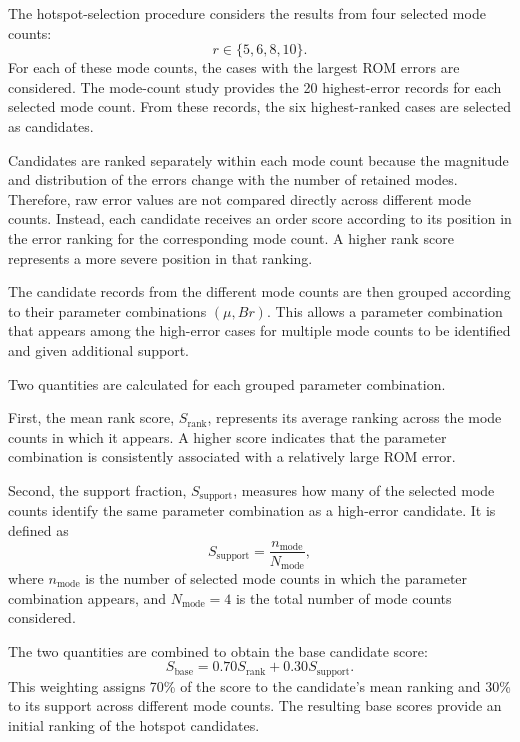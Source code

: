 The hotspot-selection procedure considers the results
from four selected mode counts:
\[
\boxed{
r\in\{5,6,8,10\}.
}
\]
For each of these mode counts, the cases with the
largest ROM errors are considered. The mode-count
study provides the 20 highest-error records for each
selected mode count. From these records, the six
highest-ranked cases are selected as candidates.

Candidates are ranked separately within each mode
count because the magnitude and distribution of the
errors change with the number of retained modes.
Therefore, raw error values are not compared directly
across different mode counts. Instead, each candidate
receives an order score according to its position in
the error ranking for the corresponding mode count.
A higher rank score represents a more severe position
in that ranking.

The candidate records from the different mode counts
are then grouped according to their parameter
combinations $(\mu,Br)$. This allows a parameter
combination that appears among the high-error cases
for multiple mode counts to be identified and given
additional support.

Two quantities are calculated for each grouped
parameter combination.

First, the mean rank score, $S_{\mathrm{rank}}$,
represents its average ranking across the mode counts
in which it appears. A higher score indicates that
the parameter combination is consistently associated
with a relatively large ROM error.

Second, the support fraction, $S_{\mathrm{support}}$,
measures how many of the selected mode counts identify
the same parameter combination as a high-error
candidate. It is defined as
\begin{equation}
    \boxed{
    S_{\mathrm{support}}
    =
    \frac{n_{\mathrm{mode}}}{N_{\mathrm{mode}}},
    }
    \label{eq:hotspot_support}
\end{equation}
where $n_{\mathrm{mode}}$ is the number of selected
mode counts in which the parameter combination appears,
and $N_{\mathrm{mode}}=4$ is the total number of
mode counts considered.

The two quantities are combined to obtain the base
candidate score:
\begin{equation}
    \boxed{
    S_{\mathrm{base}}
    =
    0.70S_{\mathrm{rank}}
    +
    0.30S_{\mathrm{support}}.
    }
    \label{eq:hotspot_base_score}
\end{equation}
This weighting assigns 70\% of the score to the
candidate's mean ranking and 30\% to its support
across different mode counts. The resulting base
scores provide an initial ranking of the hotspot
candidates.

